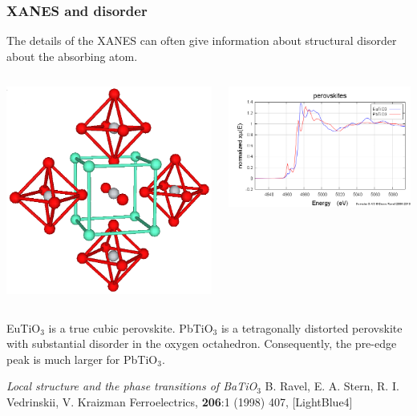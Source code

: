 \documentclass[10pt, xcolor=x11names, compress]{beamer}
\begin{document}
\begin{frame}
  \frametitle{XANES and disorder}

  The details of the XANES can often give information about structural
  disorder about the absorbing atom.
  
  \begin{columns}
    \begin{column}{0.4\linewidth}
      \begin{center}
        \includegraphics[width=0.6\linewidth]{images/perovskite.png}
      \end{center}
    \end{column}
    \begin{column}{0.6\linewidth}
      \includegraphics[width=\linewidth]{images/perov_xanes.png}
    \end{column}
  \end{columns}
  {\color{Blue3}EuTiO$_3$} is a true cubic perovskite.
  {\color{Red2}PbTiO$_3$} is a tetragonally distorted perovskite with
  substantial disorder in the oxygen octahedron.  Consequently, the
  pre-edge peak is much larger for {\color{Red2}PbTiO$_3$}.


  \begin{bottomnote}[0.52][19]
    \textit{Local structure and the phase transitions of BaTiO$_3$}
    B. Ravel, E. A. Stern, R. I. Vedrinskii, V. Kraizman
    Ferroelectrics, \textbf{206}:1 (1998) 407,
    [LightBlue4]
  \end{bottomnote}
\end{frame}
\end{document}
